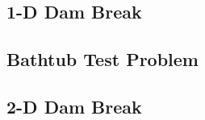 \subsection{1-D Dam Break\label{sec:dam_break_1d}}
  
\subsection{Bathtub Test Problem\label{sec:bathtub}}
  
\subsection{2-D Dam Break\label{sec:dam_break_2d}}
  
